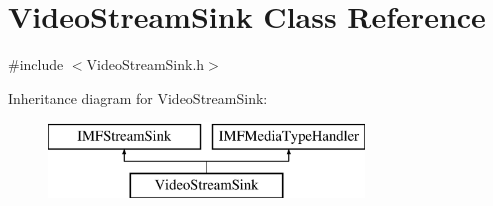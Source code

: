 \hypertarget{class_video_stream_sink}{}\section{Video\+Stream\+Sink Class Reference}
\label{class_video_stream_sink}


{\ttfamily \#include $<$Video\+Stream\+Sink.\+h$>$}

Inheritance diagram for Video\+Stream\+Sink\+:\begin{figure}[H]
\begin{center}
\leavevmode
\includegraphics[height=2.000000cm]{dd/d49/class_video_stream_sink}
\end{center}
\end{figure}

